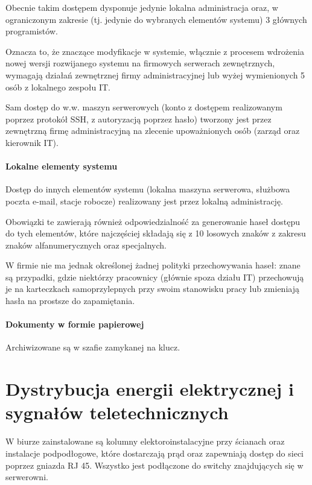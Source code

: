 \documentclass{article}
\begin{document}
            Obecnie takim dostępem dysponuje jedynie lokalna administracja oraz, w ograniczonym zakresie (tj. jedynie do wybranych elementów systemu) 3 głównych programistów.

            Oznacza to, że znaczące modyfikacje w systemie, włącznie z procesem wdrożenia nowej wersji rozwijanego systemu na firmowych serwerach zewnętrznych, wymagają działań zewnętrznej firmy administracyjnej lub wyżej wymienionych 5 osób z lokalnego zespołu IT.

            Sam dostęp do w.w. maszyn serwerowych (konto z dostępem realizowanym poprzez protokół SSH, z autoryzacją poprzez hasło) tworzony jest przez zewnętrzną firmę administracyjną na zlecenie upoważnionych osób (zarząd oraz kierownik IT).

            \paragraph{Lokalne elementy systemu}
            Dostęp do innych elementów systemu (lokalna maszyna serwerowa, służbowa poczta e-mail, stacje robocze) realizowany jest przez lokalną administrację.

            Obowiązki te zawierają również odpowiedzialność za generowanie haseł dostępu do tych elementów, które najczęściej składają się z 10 losowych znaków z zakresu znaków alfanumerycznych oraz specjalnych.

            W firmie nie ma jednak określonej żadnej polityki przechowywania haseł: znane są przypadki, gdzie niektórzy pracownicy (głównie spoza działu IT) przechowują je na karteczkach samoprzylepnych przy swoim stanowisku pracy lub zmieniają hasła na prostsze do zapamiętania.

            \paragraph{Dokumenty w formie papierowej}
            Archiwizowane są w szafie zamykanej na klucz.

    \section{Dystrybucja energii elektrycznej i sygnałów teletechnicznych}
        W biurze zainstalowane są kolumny elektoroinstalacyjne przy ścianach oraz instalacje podpodłogowe, które dostarczają prąd oraz zapewniają dostęp do sieci poprzez gniazda RJ 45. Wszystko jest podłączone do switchy znajdujących się w serwerowni.
\end{document}
